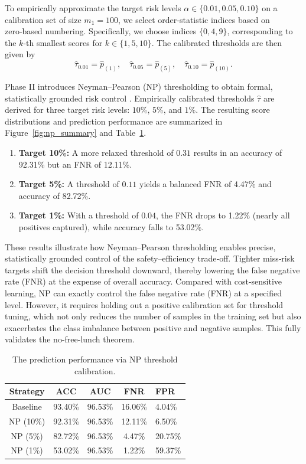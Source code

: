 \documentclass[sigconf,review,anonymous]{acmart}
\theoremstyle{remark}
\begin{document}
To empirically approximate the target risk levels \(\alpha \in \{0.01, 0.05, 0.10\}\) on a calibration set of size \(m_{1}=100\), we select order‑statistic indices based on zero‑based numbering. Specifically, we choose indices \(\{0, 4, 9\}\), corresponding to the \(k\)-th smallest scores for \(k \in \{1, 5, 10\}\). The calibrated thresholds are then given by  
\[
\hat{\tau}_{0.01}=\hat{p}_{(1)},\quad 
\hat{\tau}_{0.05}=\hat{p}_{(5)},\quad 
\hat{\tau}_{0.10}=\hat{p}_{(10)}.
\]

Phase II introduces Neyman–Pearson (NP) thresholding to obtain formal, statistically grounded risk control \cite{rigollet2011neyman,tong2018neyman}. Empirically calibrated thresholds $\hat{\tau}$ are derived for three target risk levels: $10\%$, $5\%$, and $1\%$. The resulting score distributions and prediction performance are summarized in Figure~\ref{fig:np_summary} and Table~\ref{tab:table3}.

\begin{enumerate}
    \item \textbf{Target 10\%:} A more relaxed threshold of $0.31$ results in an accuracy of 92.31\% but an FNR of 12.11\%.
    \item \textbf{Target 5\%:} A threshold of $0.11$ yields a balanced FNR of 4.47\% and accuracy of 82.72\%.
    \item \textbf{Target 1\%:} With a threshold of $0.04$, the FNR drops to 1.22\% (nearly all positives captured), while accuracy falls to 53.02\%.
\end{enumerate}


These results illustrate how Neyman–Pearson thresholding enables precise, statistically grounded control of the safety–efficiency trade‑off. Tighter miss‑risk targets shift the decision threshold downward, thereby lowering the false negative rate (FNR) at the expense of overall accuracy. Compared with cost-sensitive learning, NP can exactly control the false negative rate (FNR) at a specified level. However, it requires holding out a positive calibration set for threshold tuning, which not only reduces the number of samples in the training set but also exacerbates the class imbalance between positive and negative samples. This fully validates the no-free-lunch theorem.

\begin{table}[htbp]
    \caption{The prediction performance via NP threshold calibration.}
    \label{tab:table3}     
    \begin{tabular}{ccccl}            
        \toprule
        Strategy & ACC & AUC & FNR & FPR \\
        \midrule
        Baseline & 93.40\% & 96.53\% & 16.06\% & 4.04\% \\
        \midrule
        NP (10\%) & 92.31\% & 96.53\% & 12.11\% & 6.50\% \\
        NP (5\%)  & 82.72\% & 96.53\% & 4.47\% & 20.75\% \\
        NP (1\%)  & 53.02\% & 96.53\% & 1.22\% & 59.37\% \\
        \bottomrule
    \end{tabular}
    \vskip -0.2in
\end{table}
\end{document}

